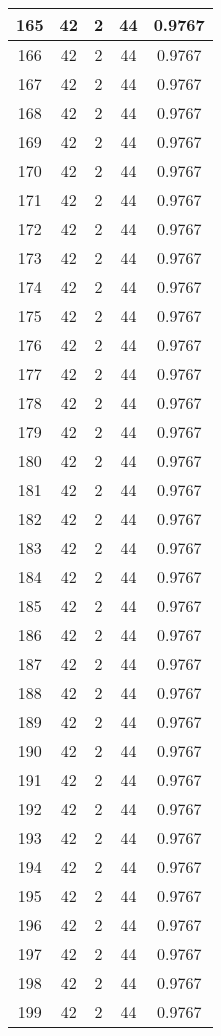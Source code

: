 \documentclass[letterpaper, 12pt]{article}
\begin{document}
\begin{longtable}{|c|c|c|c|c|}
\hline
165 & 42 & 2 & 44 & 0.9767 \\
\hline
166 & 42 & 2 & 44 & 0.9767 \\
\hline
167 & 42 & 2 & 44 & 0.9767 \\
\hline
168 & 42 & 2 & 44 & 0.9767 \\
\hline
169 & 42 & 2 & 44 & 0.9767 \\
\hline
170 & 42 & 2 & 44 & 0.9767 \\
\hline
171 & 42 & 2 & 44 & 0.9767 \\
\hline
172 & 42 & 2 & 44 & 0.9767 \\
\hline
173 & 42 & 2 & 44 & 0.9767 \\
\hline
174 & 42 & 2 & 44 & 0.9767 \\
\hline
175 & 42 & 2 & 44 & 0.9767 \\
\hline
176 & 42 & 2 & 44 & 0.9767 \\
\hline
177 & 42 & 2 & 44 & 0.9767 \\
\hline
178 & 42 & 2 & 44 & 0.9767 \\
\hline
179 & 42 & 2 & 44 & 0.9767 \\
\hline
180 & 42 & 2 & 44 & 0.9767 \\
\hline
181 & 42 & 2 & 44 & 0.9767 \\
\hline
182 & 42 & 2 & 44 & 0.9767 \\
\hline
183 & 42 & 2 & 44 & 0.9767 \\
\hline
184 & 42 & 2 & 44 & 0.9767 \\
\hline
185 & 42 & 2 & 44 & 0.9767 \\
\hline
186 & 42 & 2 & 44 & 0.9767 \\
\hline
187 & 42 & 2 & 44 & 0.9767 \\
\hline
188 & 42 & 2 & 44 & 0.9767 \\
\hline
189 & 42 & 2 & 44 & 0.9767 \\
\hline
190 & 42 & 2 & 44 & 0.9767 \\
\hline
191 & 42 & 2 & 44 & 0.9767 \\
\hline
192 & 42 & 2 & 44 & 0.9767 \\
\hline
193 & 42 & 2 & 44 & 0.9767 \\
\hline
194 & 42 & 2 & 44 & 0.9767 \\
\hline
195 & 42 & 2 & 44 & 0.9767 \\
\hline
196 & 42 & 2 & 44 & 0.9767 \\
\hline
197 & 42 & 2 & 44 & 0.9767 \\
\hline
198 & 42 & 2 & 44 & 0.9767 \\
\hline
199 & 42 & 2 & 44 & 0.9767 \\
\hline
\end{longtable}
\end{document}
